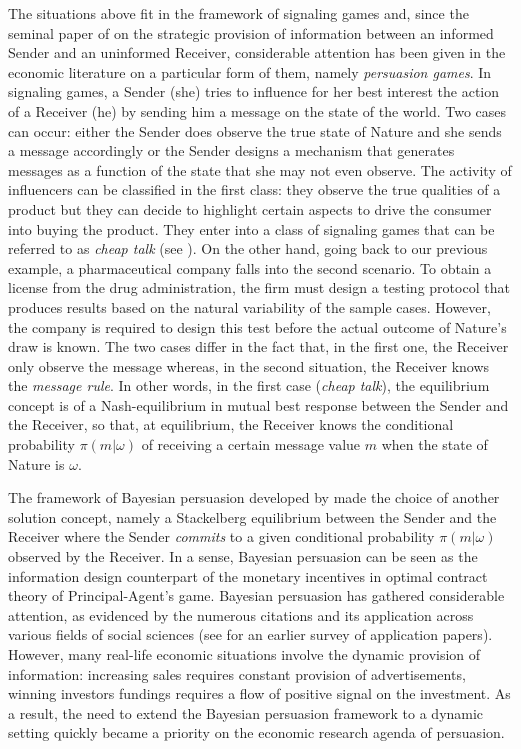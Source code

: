 \documentclass[a4paper,10pt]{article}
\theoremstyle{definition}
\theoremstyle{plain}
\numberwithin{equation}{section}
\begin{document}
The situations above fit in the framework of signaling games and, since the seminal paper of \cite{Crawford82} on the strategic provision of information between an informed Sender and an uninformed Receiver, considerable attention has been given in the economic literature on a particular form of them, namely {\em persuasion games}. In signaling games, a Sender (she) tries to influence for her best interest the action of a Receiver (he) by sending him a message on the state of the world. Two cases can occur: either the Sender does observe the true state of Nature and she sends a message accordingly or the Sender designs a mechanism that generates messages as a function of the state that she may not even observe. The activity of influencers can be classified in the first class: they observe the true qualities of a product but they can decide to highlight certain aspects to drive the consumer into buying the product. They enter into a class of signaling games that can be referred to as {\em cheap talk} (see \cite{forges2020annals}). On the other hand, going back to our previous example, a pharmaceutical company falls into the second scenario. To obtain a license from the drug administration, the firm must design a testing protocol that produces results based on the natural variability of the sample cases. However, the company is required to design this test before the actual outcome of Nature's draw is known. The two cases differ in the fact that, in the first one, the Receiver only observe the message whereas, in the second situation, the Receiver knows the {\em message rule}. In other words, in the first case ({\em cheap talk}), the equilibrium concept is of a Nash-equilibrium in mutual best response between the Sender and the Receiver, so that, at equilibrium, the Receiver knows the conditional probability $\pi(m|\omega)$ of receiving a certain message value $m$ when the state of Nature is $\omega$.

The framework of Bayesian persuasion developed by \cite{Kamenica11} made the choice of another solution concept, namely a Stackelberg equilibrium between the Sender and the Receiver where the Sender {\em commits} to a given conditional probability $\pi(m|\omega)$ observed by the Receiver. In a sense, Bayesian persuasion can be seen as the information design counterpart of the monetary incentives in optimal contract theory of Principal-Agent's game. Bayesian persuasion has gathered considerable attention, as evidenced by the numerous citations and its application across various fields of social sciences (see \cite{Kamenica19} for an earlier survey of application papers). However, many real-life economic situations involve the dynamic provision of information: increasing sales requires constant provision of advertisements, winning investors fundings requires a flow of positive signal on the investment. As a result, the need to extend the Bayesian persuasion framework to a dynamic setting quickly became a priority on the economic research agenda of persuasion.
\end{document}
